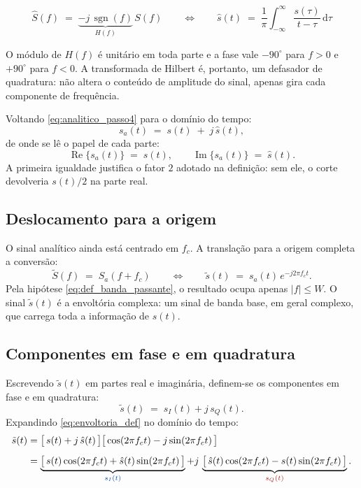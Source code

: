 \documentclass[11pt,a4paper]{article}
\newcommand{\dd}{\,\mathrm{d}}
\DeclareMathOperator{\sgn}{sgn}
\begin{document}
\begin{quadro}
\[
  \boxed{\;\hat{S}(f) \;=\; \underbrace{-j\,\sgn(f)}_{H(f)}\,S(f)
   \qquad\Longleftrightarrow\qquad
   \hat{s}(t) \;=\; \frac{1}{\pi}\int_{-\infty}^{\infty}\frac{s(\tau)}{t-\tau}\dd\tau\;}
\]
\end{quadro}

O módulo de $H(f)$ é unitário em toda parte e a fase vale $-90^{\circ}$ para $f>0$ e $+90^{\circ}$ para $f<0$. A transformada de Hilbert é, portanto, um defasador de quadratura: não altera o conteúdo de amplitude do sinal, apenas gira cada componente de frequência.

Voltando \eqref{eq:analitico_passo4} para o domínio do tempo:
\begin{equation}
  s_a(t) \;=\; s(t) \;+\; j\,\hat{s}(t),
  \label{eq:analitico_tempo}
\end{equation}
de onde se lê o papel de cada parte:
\begin{equation}
  \operatorname{Re}\bigl\{s_a(t)\bigr\} \;=\; s(t),
  \qquad
  \operatorname{Im}\bigl\{s_a(t)\bigr\} \;=\; \hat{s}(t).
  \label{eq:re_im_analitico}
\end{equation}
A primeira igualdade justifica o fator $2$ adotado na definição: sem ele, o corte devolveria $s(t)/2$ na parte real.

\subsection{Deslocamento para a origem}

O sinal analítico ainda está centrado em $f_c$. A translação para a origem completa a conversão:
\begin{equation}
  \tilde{S}(f) \;=\; S_a(f+f_c)
  \qquad\Longleftrightarrow\qquad
  \tilde{s}(t) \;=\; s_a(t)\, e^{-j2\pi f_c t}.
  \label{eq:envoltoria_def}
\end{equation}
Pela hipótese \eqref{eq:def_banda_passante}, o resultado ocupa apenas $|f| \le W$. O sinal $\tilde{s}(t)$ é a envoltória complexa: um sinal de banda base, em geral complexo, que carrega toda a informação de $s(t)$.

\subsection{Componentes em fase e em quadratura}

Escrevendo $\tilde{s}(t)$ em partes real e imaginária, definem-se os componentes em fase e em quadratura:
\begin{equation}
  \tilde{s}(t) \;=\; s_I(t) + j\, s_Q(t).
  \label{eq:iq_def}
\end{equation}
Expandindo \eqref{eq:envoltoria_def} no domínio do tempo:
\begin{align}
  \tilde{s}(t)
  &= \bigl[\,s(t) + j\,\hat{s}(t)\,\bigr]\bigl[\,\cos(2\pi f_c t) - j\sin(2\pi f_c t)\,\bigr]
  \label{eq:iq_passo1}\\[0.5em]
  &= \underbrace{\bigl[\,s(t)\cos(2\pi f_c t) + \hat{s}(t)\sin(2\pi f_c t)\,\bigr]}_{\textcolor{azul}{s_I(t)}}
   + j\,\underbrace{\bigl[\,\hat{s}(t)\cos(2\pi f_c t) - s(t)\sin(2\pi f_c t)\,\bigr]}_{\textcolor{vermelho}{s_Q(t)}} .
  \label{eq:iq_passo2}
\end{align}
\end{document}
